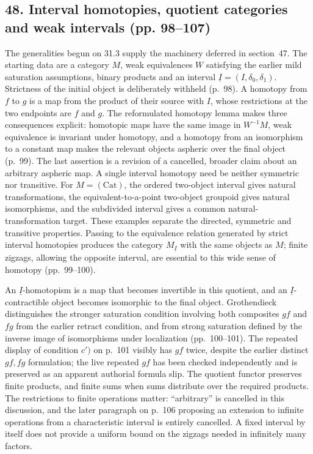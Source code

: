 \subsection*{48. Interval homotopies, quotient categories and weak intervals (pp. 98--107)}
The generalities begun on 31.3 supply the machinery deferred in section~47. The starting data are a category $M$, weak equivalences $W$ satisfying the earlier mild saturation assumptions, binary products and an interval $\underline I=(I,\delta_0,\delta_1)$. Strictness of the initial object is deliberately withheld (p.~98). A homotopy from $f$ to $g$ is a map from the product of their source with $I$, whose restrictions at the two endpoints are $f$ and $g$. The reformulated homotopy lemma makes three consequences explicit: homotopic maps have the same image in $W^{-1}M$, weak equivalence is invariant under homotopy, and a homotopy from an isomorphism to a constant map makes the relevant objects aspheric over the final object (p.~99). The last assertion is a revision of a cancelled, broader claim about an arbitrary aspheric map. A single interval homotopy need be neither symmetric nor transitive. For $M=(\mathrm{Cat})$, the ordered two-object interval gives natural transformations, the equivalent-to-a-point two-object groupoid gives natural isomorphisms, and the subdivided interval gives a common natural-transformation target. These examples separate the directed, symmetric and transitive properties. Passing to the equivalence relation generated by strict interval homotopies produces the category $M_{\underline I}$ with the same objects as $M$; finite zigzags, allowing the opposite interval, are essential to this wide sense of homotopy (pp.~99--100).

An $\underline I$-homotopism is a map that becomes invertible in this quotient, and an $\underline I$-contractible object becomes isomorphic to the final object. Grothendieck distinguishes the stronger saturation condition involving both composites $gf$ and $fg$ from the earlier retract condition, and from strong saturation defined by the inverse image of isomorphisms under localization (pp.~100--101). The repeated display of condition $c')$ on p.~101 visibly has $gf$ twice, despite the earlier distinct $gf,fg$ formulation; the live repeated $gf$ has been checked independently and is preserved as an apparent authorial formula slip. The quotient functor preserves finite products, and finite sums when sums distribute over the required products. The restrictions to finite operations matter: ``arbitrary'' is cancelled in this discussion, and the later paragraph on p.~106 proposing an extension to infinite operations from a characteristic interval is entirely cancelled. A fixed interval by itself does not provide a uniform bound on the zigzags needed in infinitely many factors.


